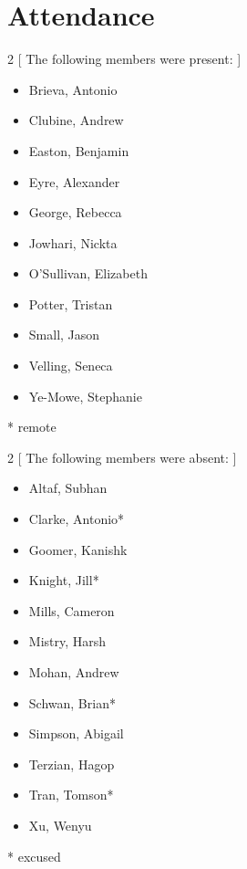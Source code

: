 \section*{Attendance}

\begin{multicols}{2}
    [
        The following members were present:
    ]
\begin{itemize}

    \item Brieva, Antonio
    \item Clubine, Andrew
    \item Easton, Benjamin
    \item Eyre, Alexander
    \item George, Rebecca
    \item Jowhari, Nickta 
    \item O'Sullivan, Elizabeth
    \item Potter, Tristan
    \item Small, Jason
    \item Velling, Seneca
    \item Ye-Mowe, Stephanie

\end{itemize}

\end{multicols}
* remote \\

\begin{multicols}{2}
    [
        The following members were absent:
    ]
\begin{itemize}

    \item Altaf, Subhan
    \item Clarke, Antonio*
    \item Goomer, Kanishk
    \item Knight, Jill*
    \item Mills, Cameron
    \item Mistry, Harsh
    \item Mohan, Andrew
    \item Schwan, Brian*
    \item Simpson, Abigail
    \item Terzian, Hagop
    \item Tran, Tomson*
    \item Xu, Wenyu

\end{itemize}
\end{multicols}
* excused\\


